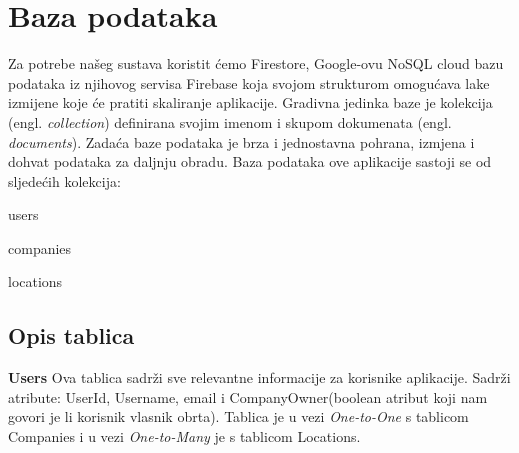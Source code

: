 	
		

		

				
		\section{Baza podataka}

  Za potrebe našeg sustava koristit ćemo Firestore, Google-ovu NoSQL cloud bazu podataka iz njihovog servisa Firebase koja svojom strukturom omogućava lake izmijene koje će pratiti skaliranje aplikacije. Gradivna jedinka baze je kolekcija (engl. \textit{collection}) definirana svojim imenom i skupom dokumenata (engl. \textit{documents}). Zadaća baze podataka je brza i jednostavna pohrana, izmjena i dohvat podataka za daljnju obradu. Baza podataka ove aplikacije sastoji se od sljedećih kolekcija:
  \begin{packed_item}
	
        	\item  users
        	\item  companies
        	\item  locations
            \end{packed_item}
		
			\subsection{Opis tablica}
			
				
				
				\textbf{Users}\hspace{1cm}  Ova tablica sadrži sve relevantne informacije za korisnike aplikacije. Sadrži atribute: UserId, Username, email i CompanyOwner(boolean atribut koji nam govori je li korisnik vlasnik obrta). Tablica je u vezi \textit{One-to-One} s tablicom Companies i u vezi \textit{One-to-Many} je s tablicom Locations. 

